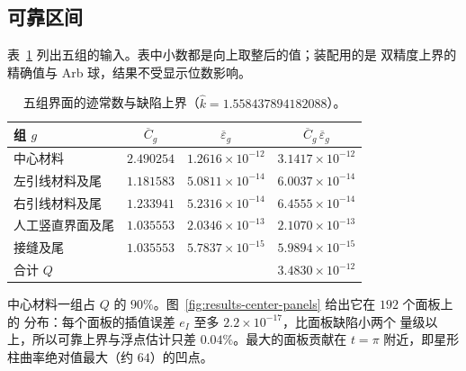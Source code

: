 \subsection{可靠区间}
\label{subsec:results-interval}

表~\ref{tab:results-groups} 列出五组的输入。表中小数都是向上取整后的值；装配用的是
双精度上界的精确值与 Arb 球，结果不受显示位数影响。
\begin{table}[htbp]
  \centering
  \caption{五组界面的迹常数与缺陷上界（$\widehat k=1.558437894182088$）。}
  \label{tab:results-groups}
  \begin{tabular}{lccc}
    \toprule
    组 $g$ & $\overline C_g$ & $\overline\varepsilon_g$ & $\overline C_g\,\overline\varepsilon_g$\\
    \midrule
    中心材料 & $2.490254$ & $1.2616\times10^{-12}$ & $3.1417\times10^{-12}$\\
    左引线材料及尾 & $1.181583$ & $5.0811\times10^{-14}$ & $6.0037\times10^{-14}$\\
    右引线材料及尾 & $1.233941$ & $5.2316\times10^{-14}$ & $6.4555\times10^{-14}$\\
    人工竖直界面及尾 & $1.035553$ & $2.0346\times10^{-13}$ & $2.1070\times10^{-13}$\\
    接缝及尾 & $1.035553$ & $5.7837\times10^{-15}$ & $5.9894\times10^{-15}$\\
    \midrule
    合计 $Q$ & & & $3.4830\times10^{-12}$\\
    \bottomrule
  \end{tabular}
\end{table}
中心材料一组占 $Q$ 的 $90\%$。图~\ref{fig:results-center-panels} 给出它在 $192$ 个面板上的
分布：每个面板的插值误差 $e_I$ 至多 $2.2\times10^{-17}$，比面板缺陷小两个
量级以上，所以可靠上界与浮点估计只差 $0.04\%$。最大的面板贡献在 $t=\pi$ 附近，即星形柱曲率绝对值最大（约 $64$）的凹点。

